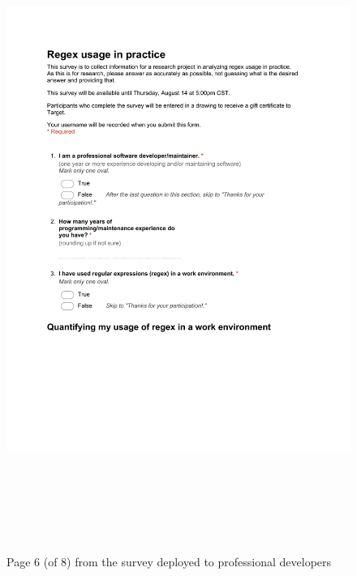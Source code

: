 \begin{figure}[!htbp]
   \centering
       \includegraphics[page=6, height=21cm,keepaspectratio]{nontex/appendix/regexUsageInPracticeSurvey}
 \caption{Page 6 (of 8) from the survey deployed to professional developers}
 \label{fig:surveyPDF6}
\end{figure}
